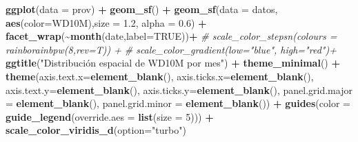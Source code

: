 \documentclass[12pt,a4paper,]{book}
\newenvironment{Shaded}{\begin{snugshade}}{\end{snugshade}}
\newcommand{\AttributeTok}[1]{\textcolor[rgb]{0.13,0.29,0.53}{#1}}
\newcommand{\CommentTok}[1]{\textcolor[rgb]{0.56,0.35,0.01}{\textit{#1}}}
\newcommand{\ConstantTok}[1]{\textcolor[rgb]{0.56,0.35,0.01}{#1}}
\newcommand{\DecValTok}[1]{\textcolor[rgb]{0.00,0.00,0.81}{#1}}
\newcommand{\FloatTok}[1]{\textcolor[rgb]{0.00,0.00,0.81}{#1}}
\newcommand{\FunctionTok}[1]{\textcolor[rgb]{0.13,0.29,0.53}{\textbf{#1}}}
\newcommand{\NormalTok}[1]{#1}
\newcommand{\SpecialCharTok}[1]{\textcolor[rgb]{0.81,0.36,0.00}{\textbf{#1}}}
\newcommand{\StringTok}[1]{\textcolor[rgb]{0.31,0.60,0.02}{#1}}
\numberwithin{dummy}{section}
\theoremstyle{ocrenumbox}
\theoremstyle{blacknumex}
\theoremstyle{blacknumbox}
\theoremstyle{ocrenum}
\theoremstyle{ocrenum}
\begin{document}
\begin{Shaded}
\begin{Highlighting}[]
\FunctionTok{ggplot}\NormalTok{(}\AttributeTok{data =}\NormalTok{ prov) }\SpecialCharTok{+} 
  \FunctionTok{geom\_sf}\NormalTok{() }\SpecialCharTok{+}
  \FunctionTok{geom\_sf}\NormalTok{(}\AttributeTok{data =}\NormalTok{ datos, }\FunctionTok{aes}\NormalTok{(}\AttributeTok{color=}\NormalTok{WD10M),}\AttributeTok{size =} \FloatTok{1.2}\NormalTok{, }\AttributeTok{alpha =} \FloatTok{0.6}\NormalTok{) }\SpecialCharTok{+}
  \FunctionTok{facet\_wrap}\NormalTok{(}\SpecialCharTok{\textasciitilde{}}\FunctionTok{month}\NormalTok{(date,}\AttributeTok{label=}\ConstantTok{TRUE}\NormalTok{))}\SpecialCharTok{+} 
  \CommentTok{\# scale\_color\_stepsn(colours = rainborainbpw(8,rev=T)) +}
  \CommentTok{\# scale\_color\_gradient(low="blue", high="red")+}
  \FunctionTok{ggtitle}\NormalTok{(}\StringTok{"Distribución espacial de WD10M por mes"}\NormalTok{) }\SpecialCharTok{+}
  \FunctionTok{theme\_minimal}\NormalTok{() }\SpecialCharTok{+}
  \FunctionTok{theme}\NormalTok{(}\AttributeTok{axis.text.x=}\FunctionTok{element\_blank}\NormalTok{(),}
        \AttributeTok{axis.ticks.x=}\FunctionTok{element\_blank}\NormalTok{(),}
        \AttributeTok{axis.text.y=}\FunctionTok{element\_blank}\NormalTok{(),}
        \AttributeTok{axis.ticks.y=}\FunctionTok{element\_blank}\NormalTok{(),}
        \AttributeTok{panel.grid.major =} \FunctionTok{element\_blank}\NormalTok{(),}
        \AttributeTok{panel.grid.minor =} \FunctionTok{element\_blank}\NormalTok{()) }\SpecialCharTok{+}
  \FunctionTok{guides}\NormalTok{(}\AttributeTok{color =} \FunctionTok{guide\_legend}\NormalTok{(}\AttributeTok{override.aes =} \FunctionTok{list}\NormalTok{(}\AttributeTok{size =} \DecValTok{5}\NormalTok{))) }\SpecialCharTok{+}
  \FunctionTok{scale\_color\_viridis\_d}\NormalTok{(}\AttributeTok{option=}\StringTok{"turbo"}\NormalTok{)}
\end{Highlighting}
\end{Shaded}
\end{document}
